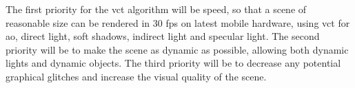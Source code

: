 The first priority for the \gls{vct} algorithm will be speed, so that a scene of reasonable size can be rendered in 30 fps on latest mobile hardware, using \gls{vct} for \gls{ao}, direct light, soft shadows, indirect light and specular light. 
The second priority will be to make the scene as dynamic as possible, allowing both dynamic lights and dynamic objects. 
The third priority will be to decrease any potential graphical glitches and increase the visual quality of the scene. 